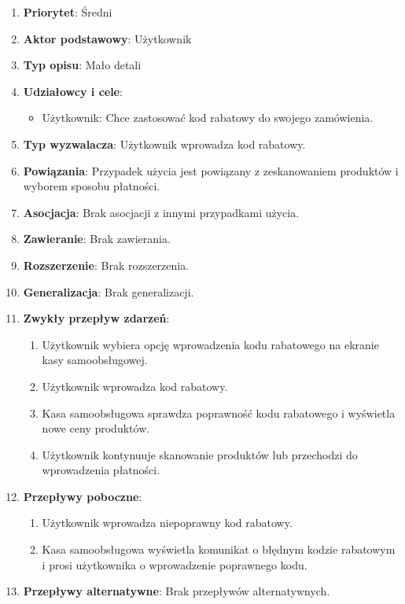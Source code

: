 \documentclass{article}
\begin{document}
\begin{enumerate}
\item \textbf{Priorytet}: Średni
\item \textbf{Aktor podstawowy}: Użytkownik
\item \textbf{Typ opisu}: Mało detali
\item \textbf{Udziałowcy i cele}:
\begin{itemize}
\item Użytkownik: Chce zastosować kod rabatowy do swojego zamówienia.
\end{itemize}
\item \textbf{Typ wyzwalacza}: Użytkownik wprowadza kod rabatowy.
\item \textbf{Powiązania}: Przypadek użycia jest powiązany z zeskanowaniem produktów i wyborem sposobu płatności.
\item \textbf{Asocjacja}: Brak asocjacji z innymi przypadkami użycia.
\item \textbf{Zawieranie}: Brak zawierania.
\item \textbf{Rozszerzenie}: Brak rozszerzenia.
\item \textbf{Generalizacja}: Brak generalizacji.
\item \textbf{Zwykły przepływ zdarzeń}:
\begin{enumerate}
\item Użytkownik wybiera opcję wprowadzenia kodu rabatowego na ekranie kasy samoobsługowej.
\item Użytkownik wprowadza kod rabatowy.
\item Kasa samoobsługowa sprawdza poprawność kodu rabatowego i wyświetla nowe ceny produktów.
\item Użytkownik kontynuuje skanowanie produktów lub przechodzi do wprowadzenia płatności.
\end{enumerate}
\item \textbf{Przepływy poboczne}:
\begin{enumerate}
\item Użytkownik wprowadza niepoprawny kod rabatowy.
\item Kasa samoobsługowa wyświetla komunikat o błędnym kodzie rabatowym i prosi użytkownika o wprowadzenie poprawnego kodu.
\end{enumerate}
\item \textbf{Przepływy alternatywne}: Brak przepływów alternatywnych.
\end{enumerate}
\end{document}
